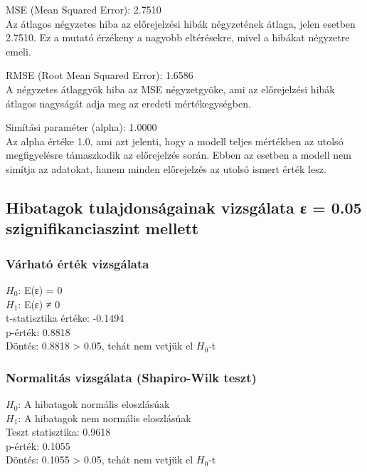 \documentclass[11pt]{article}
\begin{document}
MSE (Mean Squared Error): 2.7510\\
Az átlagos négyzetes hiba az előrejelzési hibák négyzetének átlaga,
jelen esetben 2.7510. Ez a mutató érzékeny a nagyobb eltérésekre, mivel
a hibákat négyzetre emeli.

RMSE (Root Mean Squared Error): 1.6586\\
A négyzetes átlaggyök hiba az MSE négyzetgyöke, ami az előrejelzési
hibák átlagos nagyságát adja meg az eredeti mértékegységben.

Simítási paraméter (alpha): 1.0000\\
Az alpha értéke 1.0, ami azt jelenti, hogy a modell teljes mértékben az
utolsó megfigyelésre támaszkodik az előrejelzés során. Ebben az esetben
a modell nem simítja az adatokat, hanem minden előrejelzés az utolsó
ismert érték lesz.

\subsection{Hibatagok tulajdonságainak vizsgálata ε = 0.05
szignifikanciaszint
mellett}\label{hibatagok-tulajdonsuxe1gainak-vizsguxe1lata-ux3b5-0.05-szignifikanciaszint-mellett}

\subsubsection{Várható érték
vizsgálata}\label{vuxe1rhatuxf3-uxe9rtuxe9k-vizsguxe1lata}

$H_0$: E(ε) = 0\\
$H_1$: E(ε) ≠ 0\\
t-statisztika értéke: -0.1494\\
p-érték: 0.8818\\
Döntés: 0.8818 \textgreater{} 0.05, tehát nem vetjük el $H_0$-t

\subsubsection{Normalitás vizsgálata (Shapiro-Wilk
teszt)}\label{normalituxe1s-vizsguxe1lata-shapiro-wilk-teszt}

$H_0$: A hibatagok normális eloszlásúak\\
$H_1$: A hibatagok nem normális eloszlásúak\\
Teszt statisztika: 0.9618\\
p-érték: 0.1055\\
Döntés: 0.1055 \textgreater{} 0.05, tehát nem vetjük el $H_0$-t
\end{document}
